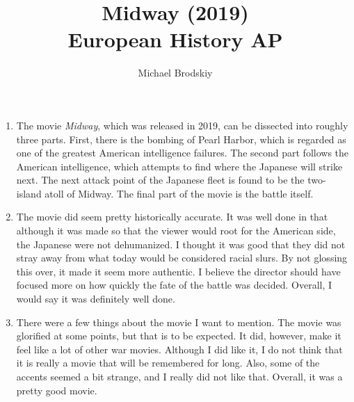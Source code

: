 \documentclass[12pt]{article}
\newcommand{\subtitle}[1]{%
  \posttitle{%
    \par\end{center}
    \begin{center}\large#1\end{center}
    \vskip0.5em}%
}
\begin{document}


\author{Michael Brodskiy}
\title{Midway (2019)\\European History AP}
\subtitle{Mrs Fisher}
\maketitle


\begin{enumerate}

\item The movie \textit{Midway}, which was released in 2019, can be dissected into roughly three parts. First, there is the bombing of Pearl Harbor, which is regarded as one of the greatest American intelligence failures. The second part follows the American intelligence, which attempts to find where the Japanese will strike next. The next attack point of the Japanese fleet is found to be the two-island atoll of Midway. The final part of the movie is the battle itself.

\item The movie did seem pretty historically accurate. It was well done in that although it was made so that the viewer would root for the American side, the Japanese were not dehumanized. I thought it was good that they did not stray away from what today would be considered racial slurs. By not glossing this over, it made it seem more authentic. I believe the director should have focused more on how quickly the fate of the battle was decided. Overall, I would say it was definitely well done.

\item There were a few things about the movie I want to mention. The movie was glorified at some points, but that is to be expected. It did, however, make it feel like a lot of other war movies. Although I did like it, I do not think that it is really a movie that will be remembered for long. Also, some of the accents seemed a bit strange, and I really did not like that. Overall, it was a pretty good movie.

\end{enumerate}
\end{document}
